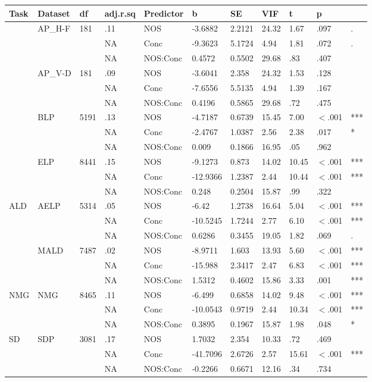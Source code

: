\begin{table}[ht]
\centering
\begingroup\normalsize
\begin{tabular}{lllllllllll}
  \hline
Task & Dataset & df & adj.r.sq & Predictor & b & SE & VIF & t & p &  \\ 
  \hline
 & AP\_H-F & 181 & .11 & NOS & -3.6882 & 2.2121 & 24.32 & 1.67 & .097 & . \\ 
   &  &  & NA & Conc & -9.3623 & 5.1724 & 4.94 & 1.81 & .072 & . \\ 
   &  &  & NA & NOS:Conc & 0.4572 & 0.5502 & 29.68 & .83 & .407 &   \\ 
   & AP\_V-D & 181 & .09 & NOS & -3.6041 & 2.358 & 24.32 & 1.53 & .128 &   \\ 
   &  &  & NA & Conc & -7.6556 & 5.5135 & 4.94 & 1.39 & .167 &   \\ 
   &  &  & NA & NOS:Conc & 0.4196 & 0.5865 & 29.68 & .72 & .475 &   \\ 
   & BLP & 5191 & .13 & NOS & -4.7187 & 0.6739 & 15.45 & 7.00 & $<$.001 & *** \\ 
   &  &  & NA & Conc & -2.4767 & 1.0387 & 2.56 & 2.38 & .017 & * \\ 
   &  &  & NA & NOS:Conc & 0.009 & 0.1866 & 16.95 & .05 & .962 &   \\ 
   & ELP & 8441 & .15 & NOS & -9.1273 & 0.873 & 14.02 & 10.45 & $<$.001 & *** \\ 
   &  &  & NA & Conc & -12.9366 & 1.2387 & 2.44 & 10.44 & $<$.001 & *** \\ 
   &  &  & NA & NOS:Conc & 0.248 & 0.2504 & 15.87 & .99 & .322 &   \\ 
  ALD & AELP & 5314 & .05 & NOS & -6.42 & 1.2738 & 16.64 & 5.04 & $<$.001 & *** \\ 
   &  &  & NA & Conc & -10.5245 & 1.7244 & 2.77 & 6.10 & $<$.001 & *** \\ 
   &  &  & NA & NOS:Conc & 0.6286 & 0.3455 & 19.05 & 1.82 & .069 & . \\ 
   & MALD & 7487 & .02 & NOS & -8.9711 & 1.603 & 13.93 & 5.60 & $<$.001 & *** \\ 
   &  &  & NA & Conc & -15.988 & 2.3417 & 2.47 & 6.83 & $<$.001 & *** \\ 
   &  &  & NA & NOS:Conc & 1.5312 & 0.4602 & 15.86 & 3.33 & .001 & *** \\ 
  NMG & NMG & 8465 & .11 & NOS & -6.499 & 0.6858 & 14.02 & 9.48 & $<$.001 & *** \\ 
   &  &  & NA & Conc & -10.0543 & 0.9719 & 2.44 & 10.34 & $<$.001 & *** \\ 
   &  &  & NA & NOS:Conc & 0.3895 & 0.1967 & 15.87 & 1.98 & .048 & * \\ 
  SD & SDP & 3081 & .17 & NOS & 1.7032 & 2.354 & 10.33 & .72 & .469 &   \\ 
   &  &  & NA & Conc & -41.7096 & 2.6726 & 2.57 & 15.61 & $<$.001 & *** \\ 
   &  &  & NA & NOS:Conc & -0.2266 & 0.6671 & 12.16 & .34 & .734 &   \\ 
   \hline
\end{tabular}
\endgroup
\end{table}
